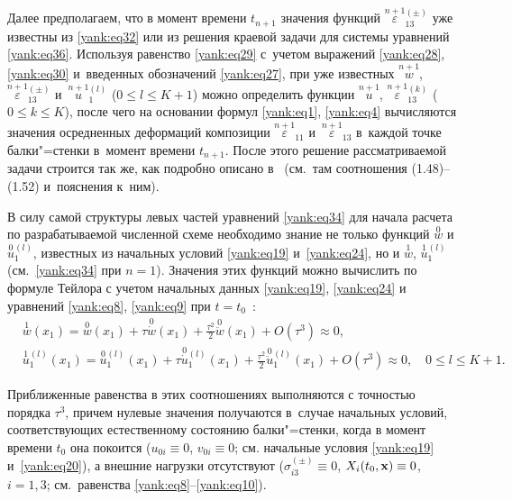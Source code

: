 Далее предполагаем, что в момент времени $t_{n+1} $ значения функций 
$\overset{n+1}{\varepsilon}{}_{13}^{(\pm )}$ уже известны из \eqref{yank:eq32} или из решения краевой задачи для системы уравнений \eqref{yank:eq36}. 
Используя равенство \eqref{yank:eq29} с~учетом выражений \eqref{yank:eq28}, \eqref{yank:eq30} и~введенных обозначений \eqref{yank:eq27}, при уже известных 
$\overset{n+1}{w}$, $\overset{n+1}{\varepsilon}{}_{13}^{(\pm )}$ 
и~$\overset{n+1}{u}{}_1^{(l)}$ ($0\le l\le K+1$) можно определить функции $\overset{n+1}{u}$,
$\overset{n+1}{\varepsilon}{}_{13}^{(k)}$ ($0\le k\le K$), после чего на основании формул \eqref{yank:eq1}, \eqref{yank:eq4} вычисляются значения осредненных деформаций композиции $\overset{n+1}{\varepsilon}_{11}$ и~$\overset{n+1}{\varepsilon}_{13}$ в~каждой точке балки"=стенки в~момент времени $t_{n+1}$. 
После этого решение рассматриваемой задачи строится так же, как подробно описано в~\cite{yank:bib13} (см.~там соотношения (1.48)--(1.52) и~пояснения к~ним).



В силу самой структуры левых частей уравнений \eqref{yank:eq34} для начала расчета по
разрабатываемой численной схеме необходимо знание не только функций $\overset{0}{w}$ и $\overset{0}{u}{}_1^{(l)}$, известных из начальных условий \eqref{yank:eq19} и~\eqref{yank:eq24}, но и $\overset{1}{w}$, $\overset{1}{u}{}_1^{(l)}$ (см.~\eqref{yank:eq34} при $n=1$). 
Значения этих функций можно вычислить по формуле Тейлора с учетом начальных данных \eqref{yank:eq19}, \eqref{yank:eq24} и уравнений \eqref{yank:eq8}, \eqref{yank:eq9}
при $t=t_0$~\cite{yank:bib23}:
\begin{equation}
\label{yank:eq38}
\begin{aligned}
&\overset{1}{w}(x_1 )=\overset{0}{w} (x_1)+\tau \overset{0}{\dot {w}} (x_1 )+\frac{\tau
^2}{2}\overset{0}{\ddot {w}}(x_1)+O (\tau ^3 )\approx 0, \\
&\overset{1}{u}{}_1^{(l)} (x_1)=\overset{0}{u}{}_1^{(l)}  (x_1)+\tau \overset{0}{\dot {u}}{}_1^{(l)}
(x_1)+\frac{\tau ^2}{2}\overset{0}{\ddot {u}}{}_1^{(l)} (x_1)+O (\tau ^3)\approx 0,\quad 0\le l\le K+1.
\end{aligned}
\end{equation}

Приближенные равенства в этих соотношениях выполняются с точностью порядка
$\tau^3$, причем нулевые значения получаются в~случае начальных условий,
соответствующих естественному состоянию балки"=стенки, когда в момент времени
$t_0$ она покоится ($u_{0i} \equiv 0$, $v_{0i} \equiv 0$; см. начальные
условия \eqref{yank:eq19} и~\eqref{yank:eq20}), а внешние нагрузки отсутствуют ($\sigma _{i3}^{(\pm )}
\equiv 0$, $X_i (t_0,{\bf x})\equiv 0$,
$i=1, 3$; см.~равенства \eqref{yank:eq8}--\eqref{yank:eq10}).

